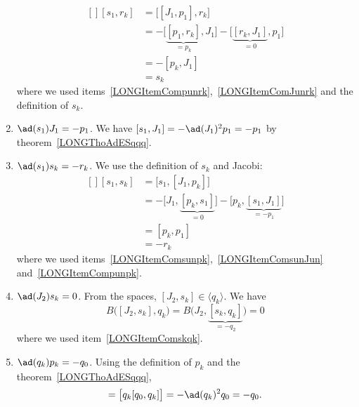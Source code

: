 \begin{enumerate}
	      \begin{equation}
		      \begin{aligned}[]
			      [s_1,r_k] & =\big[ [J_1,p_1],r_k \big]                                                                  \\
			                & =-\big[ \underbrace{[p_1,r_k]}_{=p_k},J_1 \big]-\big[ \underbrace{[r_k,J_1]}_{=0},p_1 \big] \\
			                & =-[p_k,J_1]                                                                                 \\
			                & =s_k
		      \end{aligned}
	      \end{equation}
	      where we used items~\ref{LONGItemCompunrk},~\ref{LONGItemComJunrk} and the definition of $s_k$.
	\item$\ad(s_1)J_1=-p_1$\label{LONGItemComsunJun}. We have $[s_1,J_1]=-\ad(J_1)^2p_1=-p_1$ by theorem~\ref{LONGThoAdESqqq}.
	\item$\ad(s_1)s_k=-r_k$\label{LONGItemComsunsk}. We use the definition of $s_k$ and Jacobi:
	      \begin{equation}
		      \begin{aligned}[]
			      [s_1,s_k] & =\big[ s_1,[J_1,p_k] \big]                                                                   \\
			                & =-\big[ J_1,\underbrace{[p_k,s_1]}_{=0} \big]-\big[ p_k,\underbrace{[s_1,J_1]}_{=-p_1} \big] \\
			                & =[p_k,p_1]                                                                                   \\
			                & =-r_k
		      \end{aligned}
	      \end{equation}
	      where we used items~\ref{LONGItemComsunpk},~\ref{LONGItemComsunJun} and~\ref{LONGItemCompunpk}.
	\item$\ad(J_2)s_k=0$. From the spaces, $[J_2,s_k]\in\langle q_k\rangle$. We have
	      \begin{equation}
		      B\big( [J_2,s_k],q_k \big)=B\big( J_2,\underbrace{[s_k,q_k]}_{=-q_2} \big)=0
	      \end{equation}
	      where we used item~\ref{LONGItemComskqk}.
	\item$\ad(q_k)p_k=-q_0$. Using the definition of $p_k$ and the theorem~\ref{LONGThoAdESqqq},
	      \begin{equation}
		      [q_k,p_k]=\big[ q_k[q_0,q_k] \big]=-\ad(q_k)^2q_0=-q_0.

\end{equation}
\end{enumerate}
